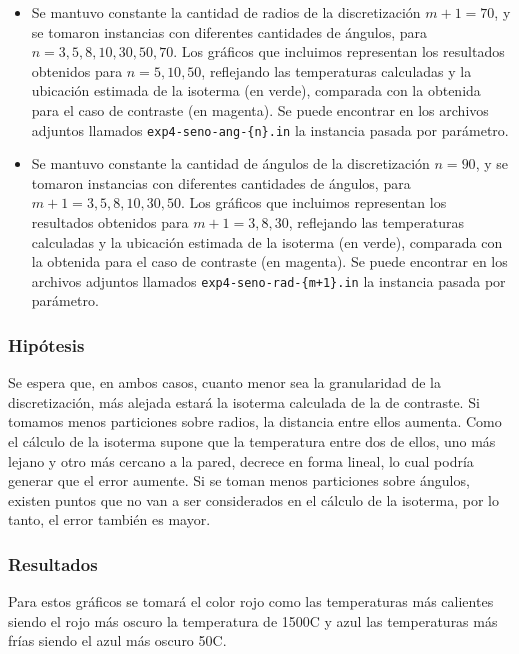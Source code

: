 \begin{enumerate}[label=(\roman*)]
            \begin{itemize}
              \item {} Se mantuvo constante la cantidad de radios de la discretización $m + 1 = 70$, y se tomaron instancias con diferentes cantidades de ángulos, para $n = 3, 5, 8, 10, 30, 50, 70$. Los gráficos que incluimos representan los resultados obtenidos para $n = 5, 10, 50$, reflejando las temperaturas calculadas y la ubicación estimada de la isoterma (en verde), comparada con la obtenida para el caso de contraste (en magenta). Se puede encontrar en los archivos adjuntos llamados \texttt{exp4-seno-ang-\{n\}.in} la instancia pasada por parámetro.
            
              \item {} Se mantuvo constante la cantidad de ángulos de la discretización $n = 90$, y se tomaron instancias con diferentes cantidades de ángulos, para $m + 1 = 3, 5, 8, 10, 30, 50$. Los gráficos que incluimos representan los resultados obtenidos para $m + 1 = 3, 8, 30$, reflejando las temperaturas calculadas y la ubicación estimada de la isoterma (en verde), comparada con la obtenida para el caso de contraste (en magenta). Se puede encontrar en los archivos adjuntos llamados \texttt{exp4-seno-rad-\{m+1\}.in} la instancia pasada por parámetro.
            \end{itemize}

        \end{enumerate}
     
      \subsubsection*{Hipótesis}
        Se espera que, en ambos casos, cuanto menor sea la granularidad de la discretización, más alejada estará la isoterma calculada de la de contraste. Si tomamos menos particiones sobre radios, la distancia entre ellos aumenta. Como el cálculo de la isoterma supone que la temperatura entre dos de ellos, uno más lejano y otro más cercano a la pared, decrece en forma lineal, lo cual podría generar que el error aumente. Si se toman menos particiones sobre ángulos, existen puntos que no van a ser considerados en el cálculo de la isoterma, por lo tanto, el error también es mayor. 

      \subsubsection*{Resultados}
        Para estos gráficos se tomará el color rojo como las temperaturas más calientes siendo el rojo más oscuro la temperatura de 1500{\degree}C y azul las temperaturas más frías siendo el azul más oscuro 50{\degree}C.

